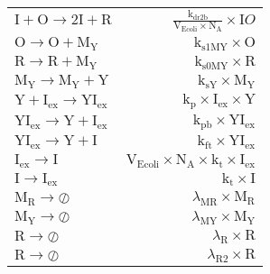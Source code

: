\documentclass[11pt]{article}
\begin{document}
\begin{table}
\begin{tabular}{l|r}
        \\
            $ \text{I} + \text{O} \rightarrow 2\text{I} + \text{R} $
               &
            $ \frac{\text{k}_{\text{dr2b}}}{\text{V}_{\text{Ecoli}} \times \text{N}_{\text{A}}}\times \text{I} O $
        \\
            $ \text{O} \rightarrow \text{O} + \text{M}_{\text{Y}} $
               &
            $ \text{k}_{\text{s1MY}} \times \text{O} $
        \\
            $ \text{R} \rightarrow \text{R} + \text{M}_{\text{Y}} $
               &
            $ \text{k}_{\text{s0MY}} \times \text{R} $
        \\
            $ \text{M}_{\text{Y}} \rightarrow \text{M}_{\text{Y}} + \text{Y} $
               &
            $ \text{k}_{\text{sY}} \times \text{M}_{\text{Y}} $
        \\
            $ \text{Y} + \text{I}_{\text{ex}} \rightarrow \text{YI}_{\text{ex}} $
               &
            $ \text{k}_{\text{p}} \times \text{I}_{\text{ex}} \times \text{Y} $
        \\
            $ \text{YI}_{\text{ex}} \rightarrow \text{Y} + \text{I}_{\text{ex}} $
               &
            $ \text{k}_{\text{pb}} \times \text{YI}_{\text{ex}} $
        \\
            $ \text{YI}_{\text{ex}} \rightarrow \text{Y} + \text{I} $
               &
            $ \text{k}_{\text{ft}} \times \text{YI}_{\text{ex}} $
        \\
            $ \text{I}_{\text{ex}} \rightarrow \text{I} $
               &
            $ \text{V}_{\text{Ecoli}} \times \text{N}_{\text{A}} \times \text{k}_{\text{t}} \times \text{I}_{\text{ex}} $
        \\
            $ \text{I} \rightarrow \text{I}_{\text{ex}} $
               &
            $ \text{k}_{\text{t}} \times \text{I} $
        \\
            $ \text{M}_{\text{R}} \rightarrow \oslash $
               &
            $ \lambda_{\text{MR}} \times \text{M}_{\text{R}} $
        \\
            $ \text{M}_{\text{Y}} \rightarrow \oslash $
               &
            $ \lambda_{\text{MY}} \times \text{M}_{\text{Y}} $
        \\
            $ \text{R} \rightarrow \oslash $
               &
            $ \lambda_{\text{R}} \times \text{R} $
        \\
            $ \text{R} \rightarrow \oslash $
               &
            $ \lambda_{\text{R2}} \times \text{R} $

\end{tabular}
\end{table}
\end{document}
